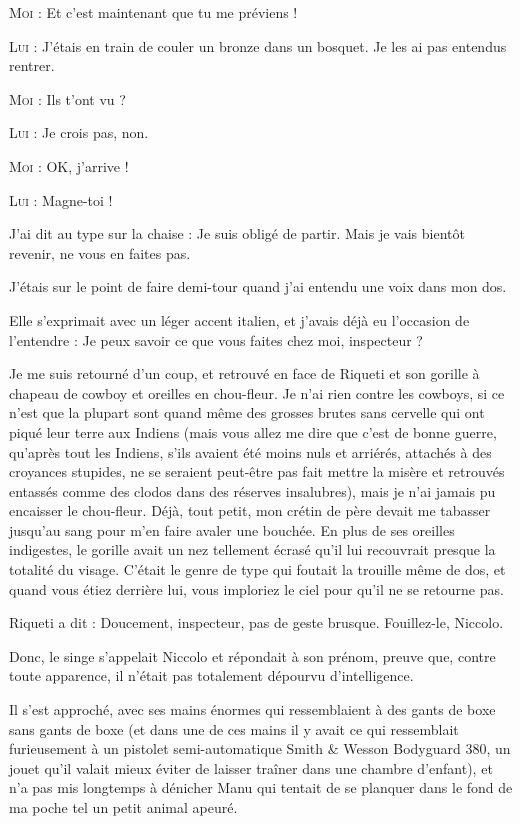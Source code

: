 \textsc{Moi} : Et c’est maintenant que tu me préviens !

\textsc{Lui} : J’étais en train de couler un bronze dans un bosquet. Je les ai pas entendus rentrer.

\textsc{Moi} : Ils t’ont vu ?

\textsc{Lui} : Je crois pas, non.

\textsc{Moi} : OK, j’arrive !

\textsc{Lui} : Magne-toi !

J’ai dit au type sur la chaise : Je suis obligé de partir. Mais je vais bientôt revenir, ne vous en faites pas.

J’étais sur le point de faire demi-tour quand j’ai entendu une voix dans mon dos.

Elle s’exprimait avec un léger accent italien, et j’avais déjà eu l’occasion de l’entendre : Je peux savoir ce que vous faites chez moi, inspecteur ?

Je me suis retourné d’un coup, et retrouvé en face de Riqueti et son gorille à chapeau de cowboy et oreilles en chou-fleur. Je n’ai rien contre les cowboys, si ce n’est que la plupart sont quand même des grosses brutes sans cervelle qui ont piqué leur terre aux Indiens (mais vous allez me dire que c’est de bonne guerre, qu’après tout les Indiens, s’ils avaient été moins nuls et arriérés, attachés à des croyances stupides, ne se seraient peut-être pas fait mettre la misère et retrouvés entassés comme des clodos dans des réserves insalubres), mais je n’ai jamais pu encaisser le chou-fleur. Déjà, tout petit, mon crétin de père devait me tabasser jusqu’au sang pour m’en faire avaler une bouchée. En plus de ses oreilles indigestes, le gorille avait un nez tellement écrasé qu’il lui recouvrait presque la totalité du visage. C’était le genre de type qui foutait la trouille même de dos, et quand vous étiez derrière lui, vous imploriez le ciel pour qu’il ne se retourne pas.

Riqueti a dit : Doucement, inspecteur, pas de geste brusque. Fouillez-le, Niccolo.

Donc, le singe s’appelait Niccolo et répondait à son prénom, preuve que, contre toute apparence, il n’était pas totalement dépourvu d’intelligence.

Il s’est approché, avec ses mains énormes qui ressemblaient à des gants de boxe sans gants de boxe (et dans une de ces mains il y avait ce qui ressemblait furieusement à un pistolet semi-automatique Smith \& Wesson Bodyguard 380, un jouet qu’il valait mieux éviter de laisser traîner dans une chambre d’enfant), et n’a pas mis longtemps à dénicher Manu qui tentait de se planquer dans le fond de ma poche tel un petit animal apeuré.

